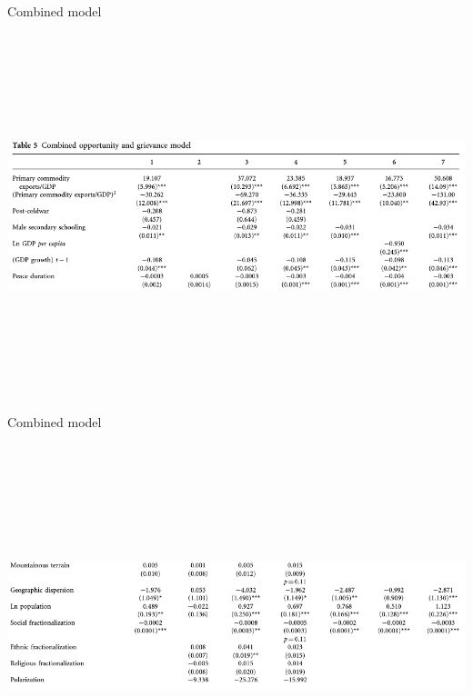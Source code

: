 \documentclass[ignorenonframetext,]{beamer}
\begin{document}
\begin{frame}{Combined model}

\begin{block}{\includegraphics[width=1100px,height=400px]{ch05}}

\end{block}

\end{frame}

\begin{frame}{Combined model}

\begin{block}{\includegraphics[width=1100px,height=400px]{ch06}}

\end{block}

\end{frame}
\end{document}

